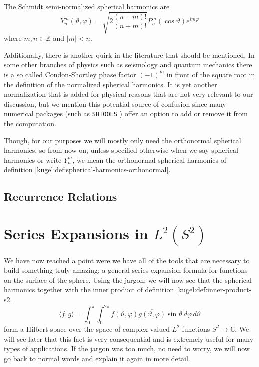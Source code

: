 \begin{definition}
  \label{kugel:def:spherical-harmonics-schmidt}
  The Schmidt semi-normalized spherical harmonics are
  \begin{equation*}
    Y^m_n(\vartheta, \varphi)
    = \sqrt{2 \frac{(n - m)!}{(n + m)!}}
      P^m_n(\cos \vartheta) e^{im\varphi}
  \end{equation*}
  where $m, n \in \mathbb{Z}$ and $|m| < n$.
\end{definition}

Additionally, there is another quirk in the literature that should be mentioned.
In some other branches of physics such as seismology and quantum mechanics there
is a so called Condon-Shortley phase factor $(-1)^m$ in front of the square root
in the definition of the normalized spherical harmonics. It is yet another
normalization that is added for physical reasons that are not very relevant to
our discussion, but we mention this potential source of confusion since many
numerical packages (such as \texttt{SHTOOLS} ) offer an
option to add or remove it from the computation.

Though, for our purposes we will mostly only need the orthonormal spherical
harmonics, so from now on, unless specified otherwise when we say spherical
harmonics or write $Y^m_n$, we mean the orthonormal spherical harmonics of
definition \ref{kugel:def:spherical-harmonics-orthonormal}.

\subsection{Recurrence Relations}

\section{Series Expansions in $L^2(S^2)$}

We have now reached a point were we have all of the tools that are necessary to
build something truly amazing: a general series expansion formula for functions
on the surface of the sphere. Using the jargon: we will now see that the
spherical harmonics together with the inner product of definition
\ref{kugel:def:inner-product-s2}
\begin{equation*}
  \langle f, g \rangle
  = \int_{0}^\pi \int_0^{2\pi}
    f(\vartheta, \varphi) \overline{g(\vartheta, \varphi)}
    \sin \vartheta \, d\varphi \, d\vartheta
\end{equation*}
form a Hilbert space over the space of complex valued $L^2$ functions $S^2 \to
\mathbb{C}$. We will see later that this fact is very consequential and is
extremely useful for many types of applications. If the jargon was too much, no
need to worry, we will now go back to normal words and explain it again in more
detail.

